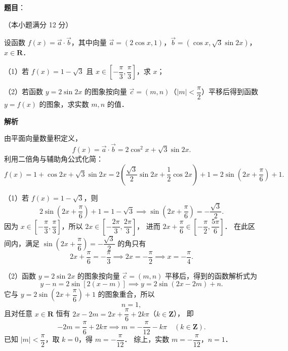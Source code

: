 \begin{answer}

\textbf{题目}：

（本小题满分 12 分）

设函数 $f(x) = \vec{a} \cdot \vec{b}$，其中向量 $\vec{a} = (2\cos x, 1)$，$\vec{b} = (\cos x, \sqrt{3}\sin 2x)$，$x \in \mathbf{R}$．

（1）若 $f(x) = 1 - \sqrt{3}$ 且 $x \in \left[-\dfrac{\pi}{3}, \dfrac{\pi}{3}\right]$，求 $x$；

（2）若函数 $y = 2\sin 2x$ 的图象按向量 $\vec{c} = (m, n)$（$|m| < \dfrac{\pi}{2}$）平移后得到函数 $y = f(x)$ 的图象，求实数 $m, n$ 的值．

\textbf{解析}

由平面向量数量积定义，
\nopagebreak[4]
\[
f(x) = \vec{a} \cdot \vec{b} = 2\cos^2 x + \sqrt{3}\sin 2x.
\]
利用二倍角与辅助角公式化简：
\nopagebreak[4]
\[
f(x) = 1 + \cos 2x + \sqrt{3}\sin 2x = 2\left(\frac{\sqrt{3}}{2}\sin 2x + \frac{1}{2}\cos 2x\right) + 1 = 2\sin\left(2x + \frac{\pi}{6}\right) + 1.
\]

（1）若 $f(x) = 1 - \sqrt{3}$，则
\nopagebreak[4]
\[
2\sin\left(2x + \frac{\pi}{6}\right) + 1 = 1 - \sqrt{3} \implies \sin\left(2x + \frac{\pi}{6}\right) = -\frac{\sqrt{3}}{2}.
\]
因为 $x \in \left[-\dfrac{\pi}{3}, \dfrac{\pi}{3}\right]$，所以 $2x \in \left[-\dfrac{2\pi}{3}, \dfrac{2\pi}{3}\right]$，
进而 $2x + \dfrac{\pi}{6} \in \left[-\dfrac{\pi}{2}, \dfrac{5\pi}{6}\right]$．
在此区间内，满足 $\sin\left(2x + \dfrac{\pi}{6}\right) = -\dfrac{\sqrt{3}}{2}$ 的角只有
\nopagebreak[4]
\[
2x + \frac{\pi}{6} = -\frac{\pi}{3} \implies 2x = -\frac{\pi}{2} \implies x = -\frac{\pi}{4}.
\]

（2）函数 $y = 2\sin 2x$ 的图象按向量 $\vec{c} = (m, n)$ 平移后，得到的函数解析式为
\nopagebreak[4]
\[
y - n = 2\sin[2(x - m)] \implies y = 2\sin(2x - 2m) + n.
\]
它与 $y = 2\sin\left(2x + \dfrac{\pi}{6}\right) + 1$ 的图象重合，所以
\nopagebreak[4]
\[
n = 1,
\]
且对任意 $x \in \mathbf{R}$ 恒有 $2x - 2m = 2x + \dfrac{\pi}{6} + 2k\pi$（$k \in \mathbf{Z}$），
即
\nopagebreak[4]
\[
-2m = \frac{\pi}{6} + 2k\pi \implies m = -\frac{\pi}{12} - k\pi \quad (k \in \mathbf{Z}).
\]
已知 $|m| < \dfrac{\pi}{2}$，取 $k = 0$，得 $m = -\dfrac{\pi}{12}$．
综上，实数 $m = -\dfrac{\pi}{12}$，$n = 1$．


\end{answer}
